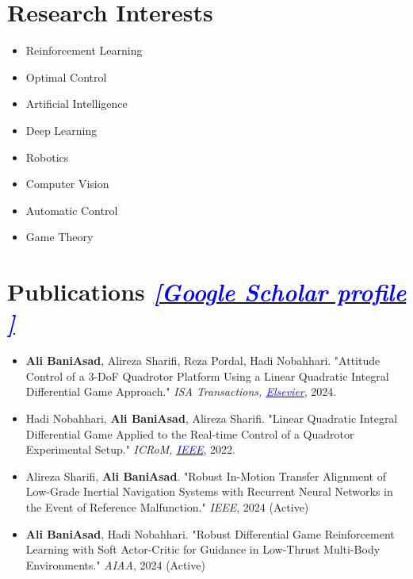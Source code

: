 \documentclass[letterpaper,11pt]{article}
\makeatletter
\newcommand{\resumeItem}[1]{
  \item\small{
    {#1 \vspace{-2pt}}
  }
}
\newcommand{\resumeSubheading}[4]{
  \vspace{-2pt}\item
    \begin{tabular*}{1.0\textwidth}[t]{l@{\extracolsep{\fill}}r}
      \textbf{ #1} & \textbf{\small #2} \\
      \textsl{\small #3} & \textit{\small #4} \\
    \end{tabular*}\vspace{-7pt}
}
\newcommand{\resumeSubHeadingListStart}{\begin{itemize}[leftmargin=0.0in, label={}]}
\newcommand{\resumeSubHeadingListEnd}{\end{itemize}}
\newcommand{\resumeItemListStart}{\begin{itemize}}
\newcommand{\resumeItemListEnd}{\end{itemize}\vspace{-5pt}}
\makeatother
\begin{document}
\section{Research Interests}
        \begin{multicols}{4}
            \begin{itemize}[itemsep=-5pt, parsep=3pt]
                \item \small Reinforcement Learning
                \item Optimal Control
                \item Artificial Intelligence
                \item Deep Learning
                \item Robotics
                \item Computer Vision
                \item Automatic Control
                \item Game Theory
            \end{itemize}
        \end{multicols}
        \vspace*{3.0\multicolsep}

\vspace{1pt}
    \section{Publications
    \href{https://scholar.google.com/citations?user=KeKpSvEAAAAJ&hl=en}{{\normalfont \textit{\textcolor{blue}{[Google Scholar profile \faGraduationCap]}}}} 
    }
    \resumeItemListStart
    \resumeItem{\textbf{Ali BaniAsad}, Alireza Sharifi, Reza Pordal, Hadi Nobahhari. "Attitude Control of a 3-DoF Quadrotor Platform Using a Linear Quadratic Integral Differential Game Approach." \textit{ISA Transactions, 
        \href{https://doi.org/10.1016/j.isatra.2024.03.005}{\textcolor{blue}{Elsevier}}}, 2024.}
     \vspace{-6pt}
    \resumeItem{Hadi Nobahhari,  \textbf{Ali BaniAsad}, Alireza Sharifi. "Linear Quadratic Integral Differential Game Applied to the Real-time Control of a Quadrotor Experimental Setup." \textit{ICRoM, \href{https://doi.org/10.1109/ICRoM57054.2022.10025263}{\textcolor{blue}{IEEE}}}, 2022.}
     \vspace{-6pt}
    \resumeItem{Alireza Sharifi, \textbf{Ali BaniAsad}. "Robust In-Motion Transfer Alignment of Low-Grade Inertial Navigation Systems with Recurrent Neural Networks in the Event of Reference Malfunction." \textit{IEEE}, 2024 (Active)}
     \vspace{-6pt}
    \resumeItem{\textbf{Ali BaniAsad}, Hadi Nobahhari. "Robust Differential Game Reinforcement Learning with Soft Actor-Critic for Guidance in Low-Thrust Multi-Body Environments." \textit{AIAA}, 2024 (Active)}
    \resumeItemListEnd
    \vspace{-16pt}
\end{document}
